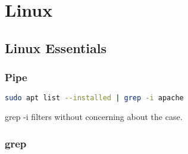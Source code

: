 


\section{Linux }


\subsection{Linux Essentials}


\subsubsection{Pipe}

\begin{lstlisting}[language=bash]
    sudo apt list --installed | grep -i apache
\end{lstlisting}
grep -i filters without concerning about the case.


\subsubsection{grep}

